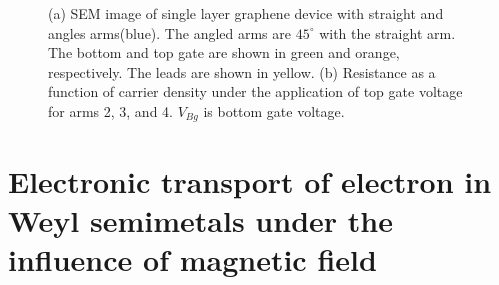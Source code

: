 \begin{figure}[H]
\begin{subfigure}[b]{0.35\linewidth}
            \caption{}
            \label{2fig:r vs v}
        \end{subfigure}
        \caption{(a) SEM image of single layer graphene device with straight and angles arms(blue). 
                    The angled arms are $45^{\circ}$ with the straight arm. 
                    The bottom and top gate are shown in green and orange, respectively. The leads are shown in yellow.
                    (b) Resistance as a function of carrier density under the application of top gate voltage for arms 2, 3, and 4. 
                    $V_{Bg}$ is bottom gate voltage.}
        \label{2fig:angle dependent transmission}
    \end{figure}
\section{Electronic transport of electron in Weyl semimetals under the influence of magnetic field} \label{2sec:transport in B field}

